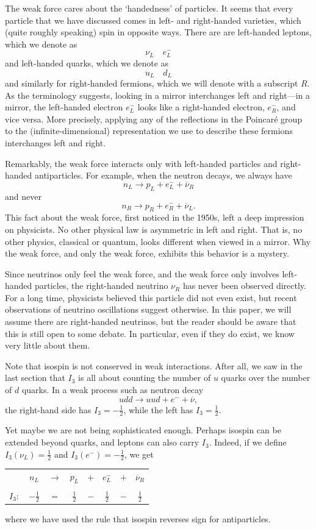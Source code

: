 \documentclass[12pt]{article}
\newcommand{\half}{\frac{1}{2}} %
\newcommand{\nubar}{\overline{\nu}} %
\begin{document}
The weak force cares about the `handedness' of particles.  It seems
that every particle that we have discussed comes in left- and right-handed 
varieties, which (quite roughly speaking) spin in opposite ways.  There are
are left-handed leptons, which we denote as
\[ \nu_L \quad e^-_L \]
and left-handed quarks, which we denote as
\[ u_L \quad d_L \]
and similarly for right-handed fermions, which we will denote with a subscript
$R$. As the terminology suggests, looking in a mirror interchanges left and
right---in a mirror, the left-handed electron $e^-_L$ looks like a 
right-handed
electron, $e^-_R$, and vice versa. More precisely, applying any of the
reflections in the Poincar\'e group to the (infinite-dimensional)
representation we use to describe these fermions interchanges left and right.

Remarkably, the weak force interacts only with left-handed particles and
right-handed antiparticles. For example, when the neutron decays, we always
have
\[ n_L \to p_L + e^-_L + \nubar_R \]
and never 
\[ n_R \to p_R + e^-_R + \nubar_L. \]
This fact about the weak force, first noticed in the 1950s, left a deep
impression on physicists. No other physical law is asymmetric in left and
right. That is, no other physics, classical or quantum, looks different when
viewed in a mirror. Why the weak force, and only the weak force, exhibits this
behavior is a mystery.

Since neutrinos only feel the weak force, and the weak force only involves
left-handed particles, the right-handed neutrino $\nu_R$ has never been
observed directly. For a long time, physicists believed this particle did not 
even exist, but recent observations of neutrino oscillations suggest otherwise. In this paper, we will assume there are right-handed neutrinos, but the reader
should be aware that this is still open to some debate. In particular, even if
they do exist, we know very little about them. 

Note that isospin is not conserved in weak interactions. After all, we saw in
the last section that $I_3$ is all about counting the number of $u$ quarks over
the number of $d$ quarks. In a weak process such as neutron decay
\[ udd \to uud + e^- + \nubar, \]
the right-hand side has $I_3 = -\half$, while the left has $I_3 = \half$. 

Yet maybe we are not being sophisticated enough. Perhaps isospin can be
extended beyond quarks, and leptons can also carry $I_3$. Indeed, if we define
$I_3( \nu_L ) = \half$ and $I_3( e^- ) = -\half$, we get
\begin{center}
	\begin{tabular}{lccccccc}
		 & $n_L$    & $\to$ & $p_L$   & $+$  &  $e_L^-$ & $+$ & $\nubar_R$ \\
\\
		$I_3:$   & $-\half$ & $=$   & $\half$ & $-$  &  $\half$ & $-$ & $\half$ \\
	\end{tabular}
\end{center}
where we have used the rule that isospin reverses sign for antiparticles.
\end{document}
